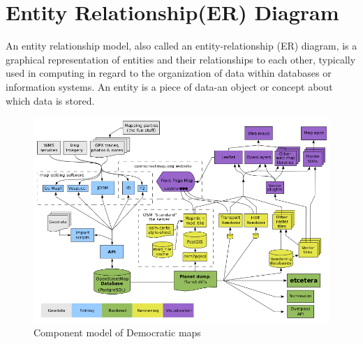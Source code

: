 \section{Entity Relationship(ER) Diagram}
An entity relationship model, also called an entity-relationship (ER) diagram, is a graphical representation of entities and their relationships to each other, typically used in computing in regard to the organization of data within databases or information systems. An entity is a piece of data-an object or concept about which data is stored.
\begin{figure}[h!]
\centering
\includegraphics[scale=0.6]{input/images/osm_er.png}
\caption{Component model of Democratic maps}
\end{figure}

